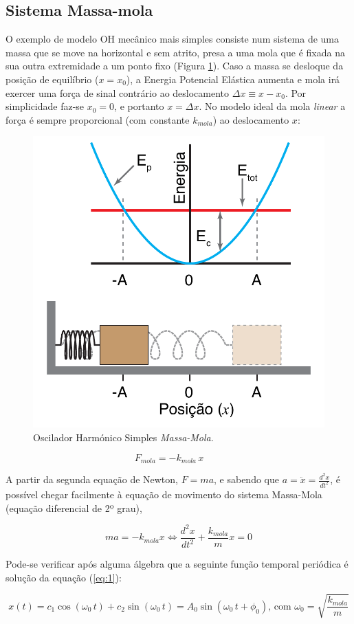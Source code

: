 \documentclass[a4paper,twoside,12pt]{article}      %
\begin{document}
\subsection{\sf Sistema Massa-mola}
O exemplo de modelo OH mecânico mais simples  consiste num sistema de uma massa que se 
move na horizontal e sem atrito,  presa a uma mola  que é fixada na sua outra extremidade a um ponto fixo (Figura \ref{fig:2}). 
Caso a massa se desloque da posição de equilíbrio ($x =x_0$), a Energia Potencial Elástica aumenta e mola irá exercer uma força de sinal contrário ao deslocamento $\Delta x \equiv x - x_0$. Por simplicidade faz-se $x_0=0$, e portanto $x=\Delta x$.
 No modelo ideal da mola \emph{linear}  a força é sempre proporcional (com constante $k_{mola}$) ao deslocamento $x$:

\begin{figure}
	[!tbp] \centering 
	\includegraphics[width=0.4	\textwidth]{harmonic_oscillator} 
	\caption{Oscilador Harmónico Simples \emph{Massa-Mola}.  \label{fig:2}} 
\end{figure}

\begin{equation}
F_{mola} = - k_{mola} \, x \qquad 
\end{equation}

A partir da segunda equação de Newton, $F=m a$, e sabendo que $ a = \ddot{x}= \frac{d^2 x}{dt^2}$, é possível chegar facilmente  à equação de movimento do sistema Massa-Mola (equação diferencial de 2º grau),

\begin{equation}
	\label{eq:1} 
 m a = - k_{mola} x \Leftrightarrow \frac{d^2 x}{dt^2}  + \frac{k_{mola}}{m} x = 0
\end{equation}

Pode-se verificar após alguma álgebra que a seguinte função temporal periódica é solução da equação (\ref{eq:1}):

\begin{equation}
	\label{eq:solu_mola}
x(t) = c_1 \cos(\omega_0 \, t) + c_2 \sin(\omega_0 \, t) = A_0 \sin(\omega_0 \, t + \phi_0) \text{, com } \omega_0 = \sqrt{\frac{k_{mola}}{m}}
\end{equation}
\end{document}
